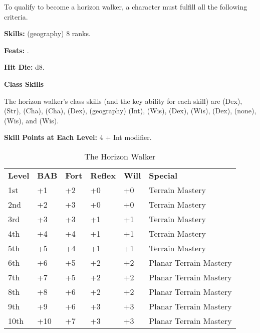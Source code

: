 
\Requirements

To qualify to become a horizon walker, a character must fulfill all the following 
criteria.

\textbf{Skills:}  (geography) 8 ranks.

\textbf{Feats:} .

\Basics

\textbf{Hit Die:} d8.

\textbf{Class Skills}

The horizon walker's class skills (and the key ability for each skill) are  
(Dex),  (Str),  (Cha),  (Cha),  (Dex),  
(geography) (Int),  (Wis),  (Dex),  (Wis),  (Dex), 
 (none),  (Wis), and  (Wis). 

\textbf{Skill Points at Each Level:} 4 + Int modifier.

\begin{table}[htb]
\caption{The Horizon Walker}
\centering
\begin{tabular}{*{6}{l}}
\textbf{Level} & \textbf{BAB} & \textbf{Fort} & \textbf{Reflex} & \textbf{Will} & \textbf{Special}\\
1st & +1 & +2 & +0 & +0 & Terrain Mastery\\
2nd & +2 & +3 & +0 & +0 & Terrain Mastery\\
3rd & +3 & +3 & +1 & +1 & Terrain Mastery \\
4th & +4 & +4 & +1 & +1 & Terrain Mastery \\
5th & +5 & +4 & +1 & +1 & Terrain Mastery \\
6th & +6 & +5 & +2 & +2 & Planar Terrain Mastery \\
7th & +7 & +5 & +2 & +2 & Planar Terrain Mastery \\
8th & +8 & +6 & +2 & +2 & Planar Terrain Mastery \\
9th & +9 & +6 & +3 & +3 & Planar Terrain Mastery \\
10th & +10 & +7 & +3 & +3 & Planar Terrain Mastery \\
\end{tabular}
\end{table}

